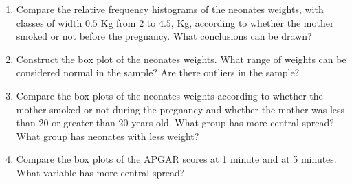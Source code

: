 \begin{enumerate}[leftmargin=*]
\begin{enumerate}
\item Compare the relative frequency histograms of the neonates weights, with classes of width $0.5$ Kg from $2$ to
$4.5$, Kg, according to whether the mother smoked or not before the pregnancy. 
What conclusions can be drawn?
\item Construct the box plot of the neonates weights.
What range of weights can be considered normal in the sample?
Are there outliers in the sample?
\item Compare the box plots of the neonates weights according to whether the mother smoked or not during the pregnancy
and whether the mother was less than 20 or greater than 20 years old.
What group has more central spread?
What group has neonates with less weight?
\item Compare the box plots of the APGAR scores at 1 minute and at 5 minutes.
What variable has more central spread?
\end{enumerate}  

\end{enumerate}
